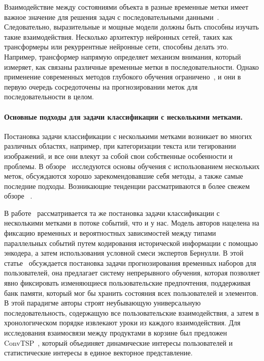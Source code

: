 \documentclass[a4paper, 12pt]{article} %
\begin{document}
Взаимодействие между состояниями объекта в разные временные метки имеет важное значение для решения задач с последовательными данными~\cite{hartvigsen2020recurrent}. Следовательно, выразительные и мощные модели должны быть способны изучать такие взаимодействия. Несколько архитектур нейронных сетей, таких как трансформеры или рекуррентные нейронные сети, способны делать это. Например, трансформер напрямую определяет механизм внимания, который измеряет, как связаны различные временные метки в последовательности. Однако применение современных методов глубокого обучения ограничено~\cite{zhang2020multi}, и они в первую очередь сосредоточены на прогнозировании меток для последовательности в целом. 

\paragraph{\textbf{Основные подходы для задачи классификации с несколькими метками.}}
Постановка задачи классификации с несколькими метками возникает во многих различных областях, например, при категоризации текста или тегировании изображений, и все они влекут за собой свои собственные особенности и проблемы. В обзоре~\cite{zhang2013review} исследуются основы обучения с использованием нескольких меток, обсуждаются хорошо зарекомендовавшие себя методы, а также самые последние подходы. Возникающие тенденции рассматриваются в более свежем обзоре ~\cite{liu2021emerging}.

В работе~\cite{shou2023concurrent} рассматривается та же постановка задачи классификации с несколькими метками в потоке событий, что и у нас. Модель авторов нацелена на фиксацию временных и вероятностных зависимостей между типами параллельных событий путем кодирования исторической информации с помощью энкодера, а затем использования условной смеси экспертов Бернулли. В этой статье~\cite{yu2023continuous} обсуждается постановка задачи прогнозирования временных наборов для пользователей, она предлагает систему непрерывного обучения, которая позволяет явно фиксировать изменяющиеся пользовательские предпочтения, поддерживая банк памяти, который мог бы хранить состояния всех пользователей и элементов. В этой парадигме авторы строят неубывающую универсальную последовательность, содержащую все пользовательские взаимодействия, а затем в хронологическом порядке извлекают уроки из каждого взаимодействия. Для исследования взаимосвязи между продуктами в корзине был предложен ConvTSP~\cite{zhang2023conv}, который объединяет динамические интересы пользователей и статистические интересы в единое векторное представление.
\end{document}

